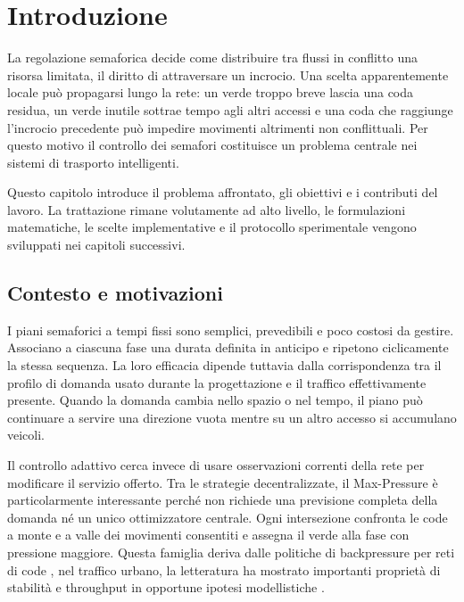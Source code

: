 \documentclass[12pt,a4paper,oneside]{report}
\numberwithin{equation}{chapter}
\begin{document}
\chapter{Introduzione}
\label{chap:introduzione}

La regolazione semaforica decide come distribuire tra flussi in conflitto una
risorsa limitata, il diritto di attraversare un incrocio. Una scelta
apparentemente locale può propagarsi lungo la rete:
un verde troppo breve lascia una coda residua, un verde inutile sottrae tempo
agli altri accessi e una coda che raggiunge l'incrocio precedente può impedire
movimenti altrimenti non conflittuali. Per questo motivo il controllo dei
semafori costituisce un problema centrale nei sistemi di trasporto
intelligenti.

Questo capitolo introduce il problema affrontato, gli obiettivi e i contributi
del lavoro. La trattazione rimane volutamente ad alto livello, le formulazioni
matematiche, le scelte implementative e il protocollo sperimentale vengono
sviluppati nei capitoli successivi.

\section{Contesto e motivazioni}

I piani semaforici a tempi fissi sono semplici, prevedibili e poco costosi da
gestire. Associano a ciascuna fase una durata definita in anticipo e
ripetono ciclicamente la stessa sequenza. La loro efficacia dipende tuttavia
dalla corrispondenza tra il profilo di domanda usato durante la progettazione e
il traffico effettivamente presente. Quando la domanda cambia nello spazio o
nel tempo, il piano può continuare a servire una direzione vuota mentre su un
altro accesso si accumulano veicoli.

Il controllo adattivo cerca invece di usare osservazioni correnti della rete
per modificare il servizio offerto. Tra le strategie decentralizzate, il
Max-Pressure è particolarmente interessante perché non richiede una previsione
completa della domanda né un unico ottimizzatore centrale. Ogni intersezione
confronta le code a monte e a valle dei movimenti consentiti e assegna il verde
alla fase con pressione maggiore. Questa famiglia deriva dalle politiche di
backpressure per reti di code \cite{tassiulas1992stability}, nel traffico
urbano, la letteratura ha mostrato importanti proprietà di stabilità e
throughput in opportune ipotesi modellistiche
\cite{varaiya2013maxpressure,wongpiromsarn2012distributed,levin2023review}.
\end{document}
